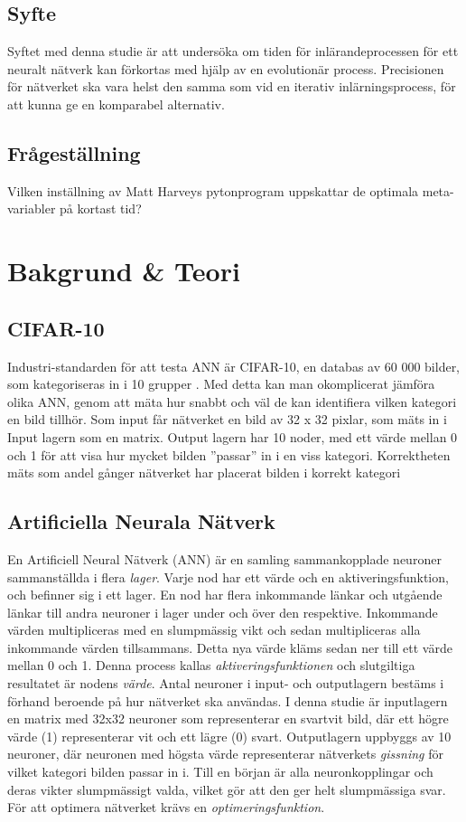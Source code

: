 \documentclass[a4paper, 12pt]{article}
\begin{document}
    \subsection{Syfte}
    Syftet med denna studie är att undersöka om tiden för inlärandeprocessen för ett neuralt nätverk kan förkortas med hjälp av en evolutionär process. Precisionen för nätverket ska vara helst den samma som vid en iterativ inlärningsprocess, för att kunna ge en komparabel alternativ.
    \subsection{Frågeställning}
    Vilken inställning av Matt Harveys pytonprogram uppskattar de optimala meta-variabler på kortast tid?

  \section{Bakgrund \& Teori}
    \subsection{CIFAR-10}
    Industri-standarden för att testa ANN är CIFAR-10, en databas av 60 000 bilder, som kategoriseras in i 10 grupper \parencite{krizhevsky2014cifar}. Med detta kan man okomplicerat jämföra olika ANN, genom att mäta hur snabbt och väl de kan identifiera vilken kategori en bild tillhör. Som input får nätverket en bild av 32 x 32 pixlar, som mäts in i Input lagern som en matrix. Output lagern har 10 noder, med ett värde mellan 0 och 1 för att visa hur mycket bilden ”passar” in i en viss kategori. Korrektheten mäts som andel gånger nätverket har placerat bilden i korrekt kategori

    \subsection{Artificiella Neurala Nätverk}
    En Artificiell Neural Nätverk (ANN) är en samling sammankopplade neuroner sammanställda i flera \textit{lager}. Varje nod har ett värde och en aktiveringsfunktion, och befinner sig i ett lager. En nod har flera inkommande länkar och utgående länkar till andra neuroner i lager under och över den respektive. Inkommande värden multipliceras med en slumpmässig vikt och sedan multipliceras alla inkommande värden tillsammans. Detta nya värde kläms sedan ner till ett värde mellan 0 och 1. Denna process kallas \textit{aktiveringsfunktionen} och slutgiltiga resultatet är nodens \textit{värde}. Antal neuroner i input- och outputlagern bestäms i förhand beroende på hur nätverket ska användas. I denna studie är inputlagern en matrix med 32x32 neuroner som representerar en svartvit bild, där ett högre värde (1) representerar vit och ett lägre (0) svart. Outputlagern uppbyggs av 10 neuroner, där neuronen med högsta värde representerar nätverkets \textit{gissning} för vilket kategori bilden passar in i. Till en början är alla neuronkopplingar och deras vikter slumpmässigt valda, vilket gör att den ger helt slumpmässiga svar. För att optimera nätverket krävs en \textit{optimeringsfunktion}.
\end{document}
